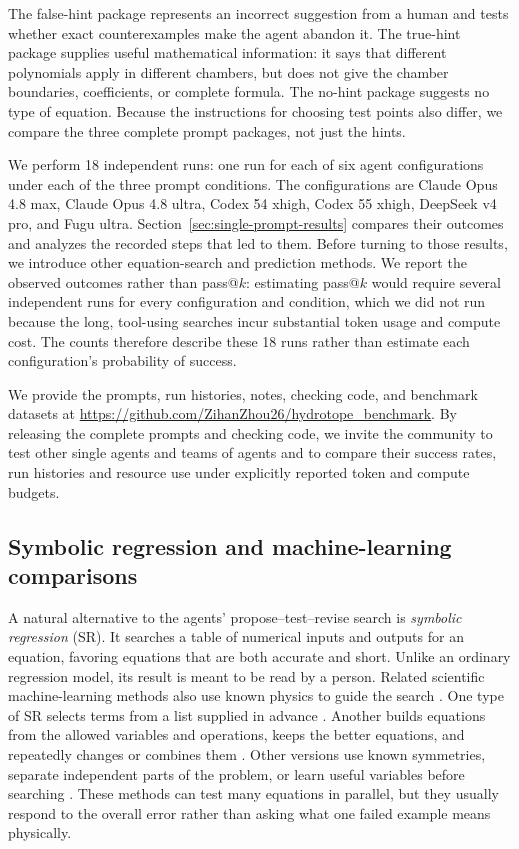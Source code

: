 \documentclass{article}
\begin{document}
The false-hint package represents an incorrect suggestion from a human and
tests whether exact counterexamples make the agent abandon it. The true-hint
package supplies useful mathematical information: it says that different
polynomials apply in different chambers, but does not give the chamber boundaries,
coefficients, or complete formula. The no-hint package suggests no type of
equation. Because the instructions for choosing test points also differ, we
compare the three complete prompt packages, not just the hints.


We perform 18 independent runs: one run for each of six agent configurations
under each of the three prompt conditions. The configurations are Claude Opus
4.8 max, Claude Opus 4.8 ultra, Codex 54 xhigh, Codex 55 xhigh, DeepSeek v4 pro,
and Fugu ultra. Section~\ref{sec:single-prompt-results} compares their
outcomes and analyzes the recorded steps that led to them. Before turning to
those results, we introduce other equation-search and prediction methods. We
report the observed outcomes rather than pass@$k$: estimating pass@$k$ would
require several independent runs for every
configuration and condition, which we did not run because the long,
tool-using searches incur substantial token usage and compute cost. The counts
therefore describe these 18 runs rather than estimate each configuration's
probability of success.

We provide the prompts, run histories, notes, checking code, and
benchmark datasets at
\url{https://github.com/ZihanZhou26/hydrotope_benchmark}. By releasing the
complete prompts and checking code, we invite the community to test other
single agents and teams of agents and to compare their success rates,
run histories and resource use under explicitly reported token and compute
budgets.

\subsection{Symbolic regression and machine-learning comparisons}
\label{sec:symbolic-regression}

A natural alternative to the agents' propose--test--revise search is
\emph{symbolic regression} (SR). It searches a table of numerical inputs and
outputs for an equation, favoring equations that are both accurate and short.
Unlike an ordinary regression model, its result is meant to be read by a
person. Related scientific machine-learning methods also use known physics to
guide the search \citep{Carleo2019MLPhysicalSciences,Karniadakis2021PIML}.
One type of SR selects terms from a list supplied in advance
\citep{Brunton2015SINDy}. Another builds equations from the allowed variables
and operations, keeps the better equations, and repeatedly changes or combines
them
\citep{Schmidt2009NaturalLaws,Bongard2007ReverseEngineering,
Burlacu2020OperonCA,LaCava2021SRBench,Makke2022SRReview}.
Other versions use known symmetries, separate independent parts of the
problem, or learn useful variables before searching
\citep{Martius2016Equations,Udrescu2020AIFeynman,
Cranmer2020SymbolicModels,Biggio2021NeuralSR,Kamienny2022TransformerSR}. These
methods can test many equations in parallel, but they usually respond to the
overall error rather than asking what one failed example means physically.
\end{document}
